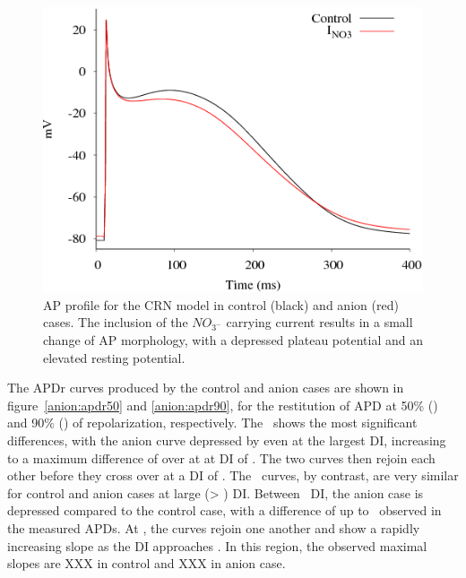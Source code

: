 \begin{figure}
\includegraphics{figures/toolkit/anion/01_AP}
\caption[Anion Sensitive AP Profile]{\label{anion:ap} AP profile for the CRN
model in control (black) and anion (red) cases.  The inclusion of the
$NO_{3^{-}}$ carrying current results in a small change of AP morphology, with
a depressed plateau potential and an elevated resting potential.}
\end{figure}

The APDr curves produced by the control and anion cases are shown in
figure~\ref{anion:apdr50} and \ref{anion:apdr90}, for the restitution of APD at
50\% (\apdr[50]) and 90\% (\apdr) of repolarization, respectively.  The
\apdr[50]\ shows the most significant differences, with the anion
curve depressed by  even at the largest DI, increasing to a maximum
difference of over  at at DI of .  The two curves then rejoin each
other before they cross over at a DI of .  The \apdr\ curves, by
contrast, are very similar for control and anion cases at large (> ) DI.
Between \ DI, the anion case is depressed compared to the control
case, with a difference of up to \ observed in the measured APDs.  At
, the curves rejoin one another and show a rapidly increasing slope as the
DI approaches .  In this region, the observed maximal slopes are XXX in
control and XXX in anion case.

